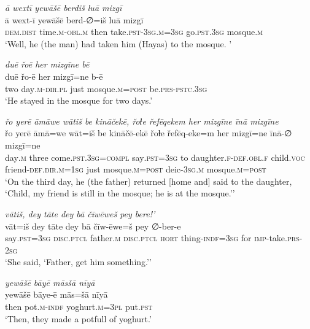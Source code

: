 \ea \label{ŽH.35}
\textit{ā wextī yewāšē berdiš luā mizgī} \\ 
\gll ā wext-ī yewāšē berd-∅=iš luā mizgī \\ 
 \textsc{dem.dist} time\textsc{.m}\textsc{-obl}\textsc{.m} then take\textsc{.pst}\textsc{-3sg}\textsc{.m}\textsc{=3sg} go\textsc{.pst}\textsc{.3sg} mosque\textsc{.m} \\ 
\glt `Well, he (the man) had taken him (Hayas) to the mosque. '
\z 
 
\ea \label{ŽH.36}
\textit{duē řoē her mizgīne bē} \\ 
\gll duē řo-ē her mizgī=ne b-ē \\ 
 two day\textsc{.m}\textsc{-dir}\textsc{.pl} just mosque\textsc{.m}\textsc{=\textsc{post}} be\textsc{.prs}\textsc{-pstc}\textsc{.3sg} \\ 
\glt `He stayed in the mosque for two days.'
\z 
 
\ea \label{ŽH.37}
\textit{řo yerē āmāwe wātiš be kināčekē, řoɫe řefēqekem her mizgīne īnā mizgīne} \\ 
\gll řo yerē āmā=we wāt=iš be kināčē-ekē řoɫe řefēq-eke=m her mizgī=ne īnā-∅ mizgī=ne \\ 
 day\textsc{.m} three come\textsc{.pst}\textsc{.3sg}\textsc{=compl} say\textsc{.pst}\textsc{=3sg} to daughter\textsc{\textsc{.f}}\textsc{-def}\textsc{.obl}\textsc{\textsc{.f}} child.\textsc{voc} friend\textsc{-def}\textsc{.dir}\textsc{.m}\textsc{=1sg} just mosque\textsc{.m}\textsc{=\textsc{post}} deic\textsc{-3sg}\textsc{.m} mosque\textsc{.m}\textsc{=\textsc{post}} \\ 
\glt `On the third day, he (the father) returned [home and] said to the daughter, ‘Child, my friend is still in the mosque; he is at the mosque.’'
\z 
 
\ea \label{ŽH.38}
\textit{vātiš, dey tāte dey bā čīwēweš pey bere!’} \\ 
\gll vāt=iš dey tāte dey bā čīw-ēwe=š pey ∅-ber-e \\ 
 say\textsc{.pst}\textsc{=3sg} \textsc{disc.ptcl} father\textsc{.m} \textsc{disc.ptcl} \textsc{hort} thing\textsc{-indf}\textsc{=3sg} for \textsc{imp-}take\textsc{.prs}-\textsc{2sg} \\ 
\glt `She said, ‘Father, get him something.’'
\z 
 
\ea \label{ŽH.39}
\textit{yewāšē bāyē māsšā nīyā} \\ 
\gll yewāšē bāye-ē mās=šā nīyā \\ 
 then pot\textsc{.m}\textsc{-indf} yoghurt\textsc{.m}\textsc{=3pl} put\textsc{.pst} \\ 
\glt `Then, they made a potfull of yoghurt.'
\z 
 

